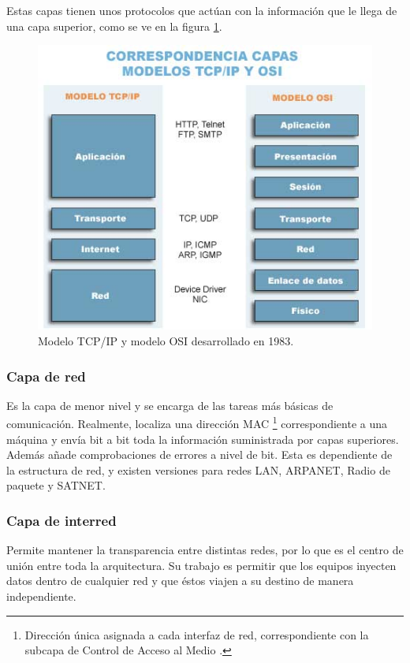 Estas capas tienen unos protocolos que actúan con la información que 
le llega de una capa superior, como se ve en la figura \ref{fig:tcpip}.

\begin{figure}
	\centering
	\includegraphics[scale=0.6]{images/tcpip.png}
	\caption[Modelo TCP/IP]{Modelo TCP/IP y modelo OSI desarrollado en 1983.}
	\label{fig:tcpip}
\end{figure}

\subsubsection*{Capa de red}
Es la capa de menor nivel y se encarga de las tareas más básicas de 
comunicación. Realmente, localiza una dirección MAC 
\footnote{Dirección única asignada a cada interfaz de red, 
correspondiente con la subcapa de Control de Acceso al Medio 
\cite{Tanenbaum}.} correspondiente a una máquina y envía bit a bit 
toda la información suministrada por capas superiores. Además añade 
comprobaciones de errores a nivel de bit. Esta es dependiente de 
la estructura de red, y existen versiones para redes LAN, ARPANET, 
Radio de paquete y SATNET.

\subsubsection*{Capa de interred}
Permite mantener la transparencia entre distintas redes, por lo 
que es el centro de unión entre toda la arquitectura. Su trabajo es 
permitir que los equipos inyecten datos dentro de cualquier red y que 
éstos viajen a su destino de manera independiente.


